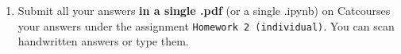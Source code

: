 \documentclass[11pt]{article}
\begin{document}
\begin{enumerate}
\item Submit all your answers \textbf{in a single .pdf} (or a single .ipynb) on Catcourses your answers under the assignment \texttt{Homework 2 (individual)}. You can scan handwritten answers or type them.
\end{enumerate}

%
%  
% 
   
\end{document}
